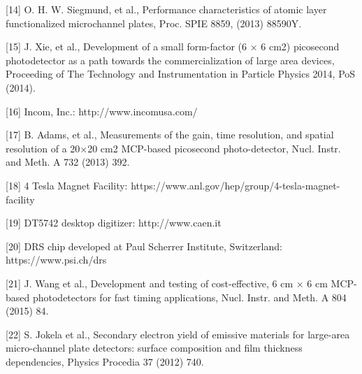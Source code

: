 \documentclass[preprint,5p]{elsarticle}
\begin{document}
\begin{thebibliography}{00}
[14] O. H. W. Siegmund, et al., Performance characteristics of atomic layer functionalized microchannel plates, Proc. SPIE 8859, (2013) 88590Y.

[15] J. Xie, et al., Development of a small form-factor (6 × 6 cm2) picosecond photodetector as a path towards the commercialization of large area devices, Proceeding of The Technology and Instrumentation in Particle Physics 2014, PoS (2014).

[16] Incom, Inc.: http://www.incomusa.com/

[17] B. Adams, et al., Measurements of the gain, time resolution, and spatial resolution of a 20×20 cm2 MCP-based picosecond photo-detector, Nucl. Instr. and Meth. A 732 (2013) 392.

[18] 4 Tesla Magnet Facility: https://www.anl.gov/hep/group/4-tesla-magnet-facility 

[19] DT5742 desktop digitizer: http://www.caen.it

[20] DRS chip developed at Paul Scherrer Institute, Switzerland: https://www.psi.ch/drs

[21] J. Wang et al., Development and testing of cost-effective, 6 cm × 6 cm MCP-based photodetectors for fast timing applications, Nucl. Instr. and Meth. A 804 (2015) 84.

[22] S. Jokela et al., Secondary electron yield of emissive materials for large-area micro-channel plate detectors: surface composition and film thickness dependencies, Physics Procedia 37 (2012) 740.


\end{thebibliography}
\end{document}
